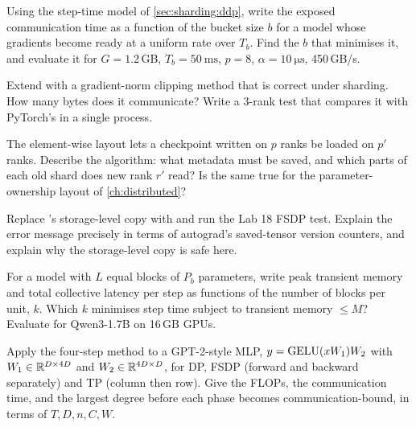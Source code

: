 \begin{exercise}
Using the step-time model of \cref{sec:sharding:ddp}, write the exposed communication time as a
function of the bucket size $b$ for a model whose gradients become ready at a uniform rate over
$T_b$. Find the $b$ that minimises it, and evaluate it for $G=1.2$\,GB, $T_b=\SI{50}{\milli\second}$,
$p=8$, $\alpha=\SI{10}{\micro\second}$, 450\,GB/s.
\end{exercise}

\begin{exercise}
Extend  with a gradient-norm clipping method that is correct
under sharding. How many bytes does it communicate? Write a 3-rank test that compares it with
PyTorch's  in a single process.
\end{exercise}

\begin{exercise}
The element-wise layout lets a checkpoint written on $p$ ranks be loaded on $p'$ ranks. Describe
the algorithm: what metadata must be saved, and which parts of each old shard does new rank $r'$
read? Is the same true for the parameter-ownership layout of \cref{ch:distributed}?
\end{exercise}

\begin{exercise}
Replace 's storage-level copy with  and run the
Lab 18 FSDP test. Explain the error message precisely in terms of autograd's saved-tensor version
counters, and explain why the storage-level copy is safe here.
\end{exercise}

\begin{exercise}
For a model with $L$ equal blocks of $P_b$ parameters, write peak transient memory and total
collective latency per step as functions of the number of blocks per unit, $k$. Which $k$
minimises step time subject to transient memory $\le M$? Evaluate for Qwen3-1.7B on 16\,GB GPUs.
\end{exercise}

\begin{exercise}
Apply the four-step method to a GPT-2-style MLP, $y = \operatorname{GELU}(xW_1)W_2$ with $W_1\in\mathbb{R}^{D\times4D}$ and
$W_2\in\mathbb{R}^{4D\times D}$, for DP, FSDP (forward and backward separately) and TP (column then row). Give
the FLOPs, the communication time, and the largest degree before each phase becomes
communication-bound, in terms of $T, D, n, C, W$.
\end{exercise}

